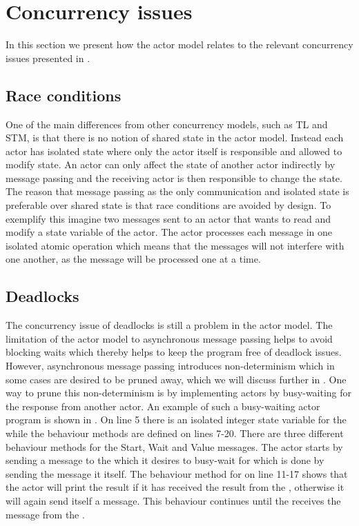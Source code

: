 \section{Concurrency issues}\label{sec:actor_con_issues}
In this section we present how the actor model relates to the relevant concurrency issues presented in .

\subsection{Race conditions}
One of the main differences from other concurrency models, such as \ac{TL} and \ac{STM}, is that there is no notion of shared state in the actor model. Instead each actor has isolated state where only the actor itself is responsible and allowed to modify state. An actor can only affect the state of another actor indirectly by message passing and the receiving actor is then responsible to change the state. The reason that message passing as the only communication and isolated state is preferable over shared state is that race conditions are avoided by design. To exemplify this imagine two messages sent to an actor that wants to read and modify a state variable of the actor. The actor processes each message in one isolated atomic operation which means that the messages will not interfere with one another, as the message will be processed one at a time.

\subsection{Deadlocks}\label{ssec:actor_deadlock}
The concurrency issue of deadlocks is still a problem in the actor model. The limitation of the actor model to asynchronous message passing helps to avoid blocking waits which thereby helps to keep the program free of deadlock issues\cite[p. 304]{tasharofi2013scala}. However, asynchronous message passing introduces non-determinism which in some cases are desired to be pruned away, which we will discuss further in . One way to prune this non-determinism is by implementing actors by busy-waiting for the response from another actor. An example of such a busy-waiting actor program is shown in . On line 5 there is an isolated integer state variable for the  while the behaviour methods are defined on lines 7-20. There are three different behaviour methods for the Start, Wait and Value messages. The actor starts by sending a message to the  which it desires to busy-wait for which is done by sending the  message it itself. The behaviour method for  on line 11-17 shows that the actor will print the result if it has received the result from the , otherwise it will again send itself a  message. This behaviour continues until the  receives the  message from the . 

